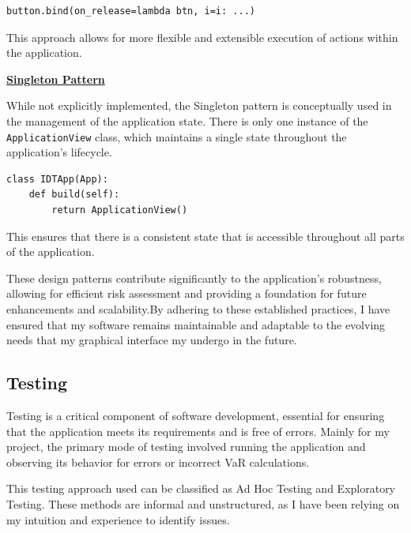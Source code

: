 \documentclass{article}
\begin{document}
\begin{verbatim}
button.bind(on_release=lambda btn, i=i: ...)
\end{verbatim}

This approach allows for more flexible and extensible execution of actions within the application.\\\vspace{0.3cm}

\underline{\textbf{Singleton Pattern}}\\\vspace{0.3cm}

While not explicitly implemented, the Singleton pattern is conceptually used in the management of the application state. There is only one instance of the \texttt{ApplicationView} class, which maintains a single state throughout the application's lifecycle.

\begin{verbatim}
class IDTApp(App):
    def build(self):
        return ApplicationView()
\end{verbatim}

This ensures that there is a consistent state that is accessible throughout all parts of the application.\\\vspace{0.3cm}

These design patterns contribute significantly to the application's robustness, allowing for efficient risk assessment and providing a foundation for future enhancements and scalability.By adhering to these established practices, I have ensured that my software remains maintainable and adaptable to the evolving needs that my graphical interface my undergo in the future.

\subsection{Testing}

Testing is a critical component of software development, essential for ensuring that the application meets its requirements and is free of errors. Mainly for my project, the primary mode of testing involved running the application and observing its behavior for errors or incorrect VaR calculations.\\\vspace{0.3cm}

This testing approach used can be classified as Ad Hoc Testing and Exploratory Testing. These methods are informal and unstructured, as I have been relying on my intuition and experience to identify issues.
\end{document}
